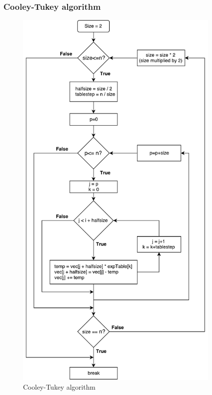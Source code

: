 \begin{refsection}
\subsubsection{Cooley-Tukey algorithm}
\begin{figure}[h]
	\centering
	\includegraphics[width=10cm]{./algorithms/fft/figures/Cooley_Tukey.pdf}
	\caption{Cooley-Tukey algorithm}\label{Cooley_Tukey}
\end{figure}

\newpage

\end{refsection}
